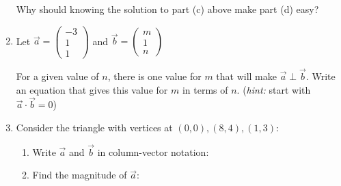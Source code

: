 \documentclass[12pt, twoside]{article}
\begin{document}
\begin{enumerate}[itemsep=1cm]
    Why should knowing the solution to part (c) above make part (d) easy?

    \vspace{2cm}

    \item Let $\vec{a} = \begin{pmatrix} -3 \\ 1 \\ 1 \end{pmatrix}$ and $\vec{b} = \begin{pmatrix} m \\ 1 \\ n \end{pmatrix}$
    
    For a given value of $n$, there is one value for $m$ that will make $\vec{a} \perp \vec{b}$. Write an equation that gives this value for $m$ in terms of $n$. (\emph{hint:} start with $\vec{a} \cdot \vec{b} = 0$)

    \newpage

    \item Consider the triangle with vertices at $(0, 0), (8, 4), (1, 3)$:
    
    \begin{center}
    \end{center}
    
    \begin{enumerate}
        \item Write $\vec{a}$ and $\vec{b}$ in column-vector notation:

        \vspace{2cm}

        \item Find the magnitude of $\vec{a}$:

        \vspace{2cm}


\end{enumerate}
\end{enumerate}
\end{document}
